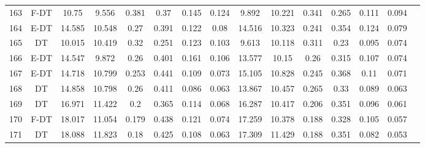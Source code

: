 \begin{longtable}{@{\hskip3pt}c@{\hskip3pt}c@{\hskip3pt}c@{\hskip3pt}c@{\hskip3pt}c@{\hskip3pt}c@{\hskip3pt}c@{\hskip3pt}c@{\hskip3pt}c@{\hskip3pt}c@{\hskip3pt}c@{\hskip3pt}c@{\hskip3pt}c@{\hskip3pt}c@{\hskip3pt}c}
        163 &           F-DT &             10.75 &          9.556 &           0.381 &            0.37 &           0.145 &           0.124 &               9.892 &          10.221 &           0.341 &         0.265 &          0.111 &           0.094 \\
        164 &           E-DT &            14.585 &         10.548 &            0.27 &           0.391 &           0.122 &            0.08 &              14.516 &          10.323 &           0.241 &         0.354 &          0.124 &           0.079 \\
        165 &             DT &            10.015 &         10.419 &            0.32 &           0.251 &           0.123 &           0.103 &               9.613 &          10.118 &           0.311 &          0.23 &          0.095 &           0.074 \\
        166 &           E-DT &            14.547 &          9.872 &            0.26 &           0.401 &           0.161 &           0.106 &              13.577 &           10.15 &            0.26 &         0.315 &          0.107 &           0.074 \\
        167 &           E-DT &            14.718 &         10.799 &           0.253 &           0.441 &           0.109 &           0.073 &              15.105 &          10.828 &           0.245 &         0.368 &           0.11 &           0.071 \\
        168 &             DT &            14.858 &         10.798 &            0.26 &           0.411 &           0.086 &           0.063 &              13.867 &          10.457 &           0.265 &          0.33 &          0.089 &           0.063 \\
        169 &             DT &            16.971 &         11.422 &             0.2 &           0.365 &           0.114 &           0.068 &              16.287 &          10.417 &           0.206 &         0.351 &          0.096 &           0.061 \\
        170 &           F-DT &            18.017 &         11.054 &           0.179 &           0.438 &           0.121 &           0.074 &              17.259 &          10.378 &           0.188 &         0.328 &          0.105 &           0.057 \\
        171 &             DT &            18.088 &         11.823 &            0.18 &           0.425 &           0.108 &           0.063 &              17.309 &          11.429 &           0.188 &         0.351 &          0.082 &           0.053 \\

\end{longtable}
